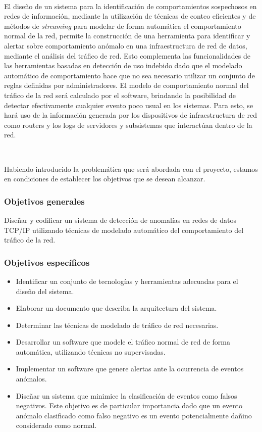 \documentclass[a4paper,12pt, oneside]{article}
\begin{document}
\

El diseño de un sistema para la identificación de comportamientos sospechosos en redes de información, mediante la utilización de técnicas de conteo eficientes y de métodos de \textit{streaming} para modelar de forma automática el comportamiento normal de la red, permite la construcción de una herramienta para identificar y alertar sobre comportamiento anómalo en una infraestructura de red de datos, mediante el análisis del tráfico de red. Esto complementa las funcionalidades de las herramientas basadas en detección de uso indebido dado que el modelado automático de comportamiento hace que no sea necesario utilizar un conjunto de reglas definidas por administradores. El modelo de comportamiento normal del tráfico de la red será calculado por el software, brindando la posibilidad de detectar efectivamente cualquier evento poco usual en los sistemas. Para esto, se hará uso de la información generada por los dispositivos de infraestructura de red como routers y los logs de servidores y subsistemas que interactúan dentro de la red.

\

Habiendo introducido la problemática que será abordada con el proyecto, estamos en condiciones de establecer los objetivos que se desean alcanzar.

\subsubsection*{Objetivos generales}
Diseñar y codificar un sistema de detección de anomalías en redes de datos TCP/IP utilizando técnicas de modelado automático del comportamiento del tráfico de la red.

\subsubsection*{Objetivos específicos}
\begin{itemize}
	\item Identificar un conjunto de tecnologías y herramientas adecuadas para el diseño del sistema.
	\item Elaborar un documento que describa la arquitectura del sistema.
	\item Determinar las técnicas de modelado de tráfico de red necesarias.
	\item Desarrollar un software que modele el tráfico normal de red de forma automática, utilizando técnicas no supervisadas.
	\item Implementar un software que genere alertas ante la ocurrencia de eventos anómalos.
	\item Diseñar un sistema que minimice la clasificación de eventos como falsos negativos. Este objetivo es de particular importancia dado que un evento anómalo clasificado como falso negativo es un evento potencialmente dañino considerado como normal.
\end{itemize}
\end{document}
